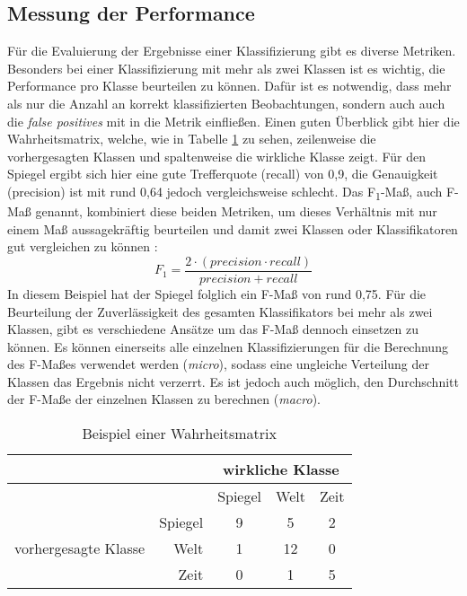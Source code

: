 \subsection{Messung der Performance}
Für die Evaluierung der Ergebnisse einer Klassifizierung gibt es diverse Metriken. Besonders bei einer Klassifizierung mit mehr als zwei Klassen ist es wichtig, die Performance pro Klasse beurteilen zu können. Dafür ist es notwendig, dass mehr als nur die Anzahl an korrekt klassifizierten Beobachtungen, sondern auch auch die \textit{false positives} mit in die Metrik einfließen. Einen guten Überblick gibt hier die Wahrheitsmatrix, welche, wie in Tabelle \ref{table.confusion_matrix} zu sehen, zeilenweise die vorhergesagten Klassen und spaltenweise die wirkliche Klasse zeigt. Für den Spiegel ergibt sich hier eine gute Trefferquote (recall) von 0,9, die Genauigkeit (precision) ist mit rund 0,64 jedoch vergleichsweise schlecht. Das F\textsubscript{1}-Maß, auch F-Maß genannt, kombiniert diese beiden Metriken, um dieses Verhältnis mit nur einem Maß aussagekräftig beurteilen und damit zwei Klassen oder Klassifikatoren gut vergleichen zu können \cite[S.~88-89]{geron2017hands}:
\[ F_1 = \frac{2 \cdot (precision \cdot recall)}{precision + recall} \]
In diesem Beispiel hat der Spiegel folglich ein F-Maß von rund 0,75. Für die Beurteilung der Zuverlässigkeit des gesamten Klassifikators bei mehr als zwei Klassen, gibt es verschiedene Ansätze um das F-Maß dennoch einsetzen zu können. Es können einerseits alle einzelnen Klassifizierungen für die Berechnung des F-Maßes verwendet werden (\textit{micro}), sodass eine ungleiche Verteilung der Klassen das Ergebnis nicht verzerrt. Es ist jedoch auch möglich, den Durchschnitt der F-Maße der einzelnen Klassen zu berechnen (\textit{macro}).

\begin{table}
\centering
\begin{spacing}{1.25}
\begin{tabular}[t]{lrccc}
\toprule
~ & ~ & \multicolumn{3}{c}{wirkliche Klasse}\\
\midrule
~ & ~ & Spiegel & Welt & Zeit\\
\multirow{3}{*}{vorhergesagte Klasse} & Spiegel & 9 & 5 & 2\\
& Welt & 1 & 12 & 0\\
& Zeit & 0 & 1 & 5\\
\bottomrule
\end{tabular}
\caption{Beispiel einer Wahrheitsmatrix}
\label{table.confusion_matrix}
\end{spacing}
\end{table}

